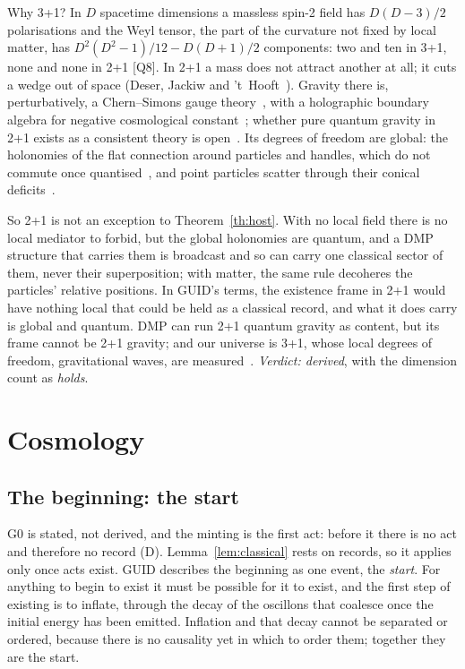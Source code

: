 \documentclass[11pt,a4paper]{article}
\theoremstyle{definition}
\theoremstyle{remark}
\newcommand{\chk}[1]{\textsf{[#1]}}
\newcommand{\tagD}{\textsf{(D)}}
\theoremstyle{definition}
\begin{document}
Why 3+1? In $D$ spacetime dimensions a massless spin-2 field has $D(D-3)/2$ polarisations and the Weyl tensor, the part of the curvature
not fixed by local matter, has $D^2(D^2-1)/12-D(D+1)/2$ components: two and ten in 3+1, none and none in 2+1 \chk{Q8}. In 2+1 a mass does not
attract another at all; it cuts a wedge out of space (Deser, Jackiw and 't~Hooft~\cite{djt}). Gravity there is, perturbatively, a
Chern--Simons gauge theory~\cite{witten88}, with a holographic boundary algebra for negative cosmological constant~\cite{bh}; whether pure
quantum gravity in 2+1 exists as a consistent theory is open~\cite{mw}. Its degrees of freedom are global: the holonomies of the flat
connection around particles and handles, which do not commute once quantised~\cite{nr}, and point particles scatter through their conical
deficits~\cite{thooft88}.

So 2+1 is not an exception to Theorem~\ref{th:host}. With no local field there is no local mediator to forbid, but the global holonomies are
quantum, and a DMP structure that carries them is broadcast and so can carry one classical sector of them, never their superposition; with
matter, the same rule decoheres the particles' relative positions. In GUID's terms, the existence frame in 2+1 would have nothing local
that could be held as a classical record, and what it does carry is global and quantum. DMP can run 2+1 quantum gravity as content, but
its frame cannot be 2+1 gravity;
and our universe is 3+1, whose local degrees of freedom, gravitational waves, are measured~\cite{gw150914}. \emph{Verdict: derived}, with
the dimension count as \emph{holds}.

\section{Cosmology}\label{sec:cosmo}

\subsection{The beginning: the start}

G0 is stated, not derived, and the minting is the first act: before it there is no act and therefore no record \tagD.
Lemma~\ref{lem:classical} rests on records, so it applies only once acts exist. GUID describes the beginning as one event, the
\emph{start}. For anything to begin to exist it must be possible for it to exist, and the first step of existing is to inflate, through the
decay of the oscillons that coalesce once the initial energy has been emitted. Inflation and that decay cannot be separated or ordered,
because there is no causality yet in which to order them; together they are the start.
\end{document}
